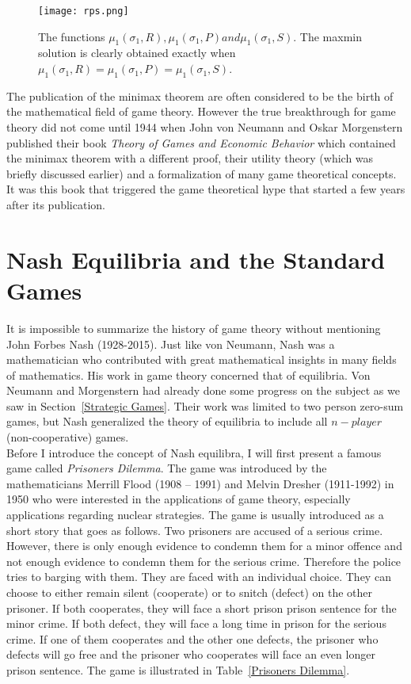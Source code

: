 \documentclass{article}
\theoremstyle{definition}
\theoremstyle{remark}
\begin{document}
\begin{figure}[h!]
  \begin{center}
\texttt{[image: rps.png]}
\end{center}
\caption{The functions $\mu_1(\sigma_1, R),  \mu_1(\sigma_1,
P) and \mu_1(\sigma_1, S)$. The maxmin solution is clearly obtained
exactly when $\mu_1(\sigma_1, R) =  \mu_1(\sigma_1,
P) = \mu_1(\sigma_1, S)$.}
\label{value r p s}
\end{figure}
The publication of the minimax theorem are often considered to be the
birth of the mathematical field of game theory. However the true
breakthrough for game theory did not come until 1944 when John von
Neumann and Oskar Morgenstern published their book \emph{Theory of
  Games and Economic Behavior} which contained the minimax theorem
with a different proof, their utility theory
(which was briefly discussed earlier) and a formalization
of many game theoretical concepts. It was this book that triggered the
game theoretical hype that started a few years after its
publication.
\section{Nash Equilibria and the Standard Games}

It is impossible to summarize the history of game theory without
mentioning John Forbes Nash (1928-2015). Just like von Neumann, Nash
was a mathematician who contributed with great mathematical insights
in many fields of mathematics. His work in game theory concerned that
of equilibria. Von Neumann and Morgenstern had already done some
progress on the subject as we saw in Section~\ref{Strategic
  Games}. Their work was limited to two person zero-sum games, but
Nash generalized the theory of equilibria to include all $n-player$
(non-cooperative) games.\\

Before I introduce the concept of Nash equilibra, I will first present
a famous game called \emph{Prisoners Dilemma}. The game was introduced
by the mathematicians Merrill Flood (1908 – 1991) and Melvin Dresher
(1911-1992) in 1950 who were interested in the applications of game
theory, especially applications regarding nuclear
strategies. \citep{sep-prisoner-dilemma} The game is usually
introduced as a short story that goes as follows. Two prisoners are
accused of a serious crime. However, there is only enough evidence to condemn
them for a minor offence and not enough evidence to condemn them for
the serious crime. Therefore the police tries to barging with
them. They are faced with an individual choice. They can choose to
either remain silent (cooperate) or to snitch (defect) on the other
prisoner. If both cooperates, they will face a short prison prison
sentence for the minor crime. If both defect, they will face a long time in prison for
the serious crime. If one of them cooperates and the other one defects,
the prisoner who defects will go free and the prisoner who cooperates
will face an even longer prison sentence. The game is illustrated in
Table~\ref{Prisoners Dilemma}.\\
\end{document}
